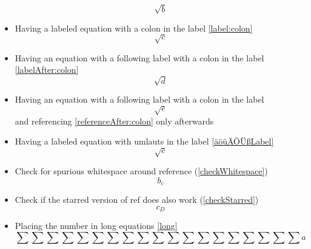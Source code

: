 \documentclass{article}
\def\ifautonum#1{#1}%
\def\ifautonum#1{}%
\def\ifcleveref#1{#1}%
\def\ifcleveref#1{}%
\begin{document}
\begin{itemize}
			\begin{equation}\label{äöüÄÖÜß?:, 3075µ!/§}
				\sqrt{b}
			\end{equation}
		\item Having a labeled equation with a colon in the label \ref{label:colon}
			\begin{equation}\label{label:colon}
				\sqrt{c}
			\end{equation}
		\item Having an equation with a following label with a colon in the label \ref{labelAfter:colon}
			\begin{equation}
				\sqrt{d}\label{labelAfter:colon}
			\end{equation}
		\item Having an equation with a following label with a colon in the label
			\begin{equation}
				\sqrt{e}\label{referenceAfter:colon}
			\end{equation}
			and referencing \ref{referenceAfter:colon} only afterwards
		\item Having a labeled equation with umlauts in the label \ref{äöüÄÖÜßLabel}
			\begin{equation}\label{äöüÄÖÜßLabel}
				\sqrt{c}
			\end{equation}
		\item Check for spurious whitespace around reference (\ref{checkWhitespace})
			\begin{equation}\label{checkWhitespace}
				b_c
			\end{equation}
		\item Check if the starred version of ref does also work (\ref*{checkStarred})
			\begin{equation}\label{checkStarred}
				c_D
			\end{equation}
		\ifcleveref{
			\item Check if the starred version of cref does also work (\cref*{checkStarredCref})
				\begin{equation}\label{checkStarredCref}
					d_E
				\end{equation}
		}
		\item Placing the number in long equations \ref{long}
			\begin{equation}\label{long}
				\sum\sum\sum\sum\sum\sum\sum\sum\sum\sum\sum\sum\sum\sum\sum\sum\sum\sum\sum a
			\end{equation}
		\ifautonum{
			\item Printing the number without referencing (needs autonum)
				\begin{equation+}

\end{equation+}}
\end{itemize}
\end{document}
